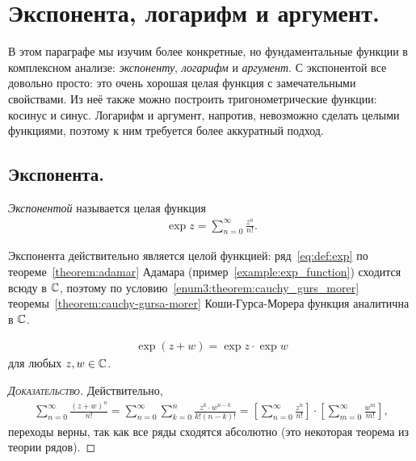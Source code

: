 \documentclass[../complex-analysis.tex]{subfiles}
\begin{document}
\newpage
\section{Экспонента, логарифм и аргумент.}

В этом параграфе мы изучим более конкретные, но фундаментальные функции в комплексном анализе: \emph{экспоненту}, \emph{логарифм} и \emph{аргумент}. С экспонентой все довольно просто: это очень хорошая целая функция с замечательными свойствами. Из неё также можно построить тригонометрические функции: косинус и синус. Логарифм и аргумент, напротив, невозможно сделать целыми функциями, поэтому к ним требуется более аккуратный подход.

\subsection{Экспонента.}

\begin{df}
 \emph{Экспонентой} называется целая функция
 \begin{align}
  \label{eq:def:exp}
  \exp z = \sum_{n=0}^{\infty} \frac{z^{n}}{n!}.
 \end{align}
\end{df}
\begin{remrk}
 Экспонента действительно является целой функцией: ряд~\eqref{eq:def:exp} по теореме~\ref{theorem:adamar} Адамара (пример~\ref{example:exp_function}) сходится всюду в $ \mathbb{C} $, поэтому по условию~\ref{enum3:theorem:cauchy_gurs_morer} теоремы~\ref{theorem:cauchy-gursa-morer} Коши-Гурса-Морера функция аналитична в $ \mathbb{C} $.
\end{remrk}

\begin{prop}
 \begin{align}
  \label{eq:exponent_common_property}
  \exp(z+w) = \exp z \cdot \exp w
 \end{align} для любых $ z,w\in\mathbb{C} $.
\end{prop}
\begin{proof}[\normalfont\textsc{Доказательство}]
 Действительно,
 \begin{align*}
  \sum_{n=0}^{\infty} \frac{(z+w)^{n}}{n!} = \sum_{n=0}^{\infty} \sum_{k=0}^{n} \frac{z^{k}\cdot w^{n-k}}{k!(n-k)!} = \left[ \sum_{n=0}^{\infty} \frac{z^{n}}{n!} \right] \cdot \left[ \sum_{m=0}^{\infty}\frac{w^{m}}{m!} \right],
 \end{align*} переходы верны, так как все ряды сходятся абсолютно (это некоторая теорема из теории рядов).
\end{proof}
\end{document}
